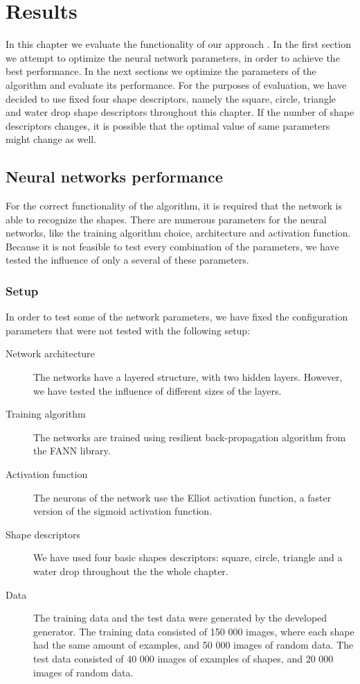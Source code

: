 \chapter{Results}
In this chapter we evaluate the functionality of our approach . In the first section\XX{,} we attempt to optimize  the neural network parameters, in order to achieve the best performance. In the next sections\XX{,} we optimize the parameters of the algorithm and evaluate its performance. For the purposes of evaluation, we have decided to use fixed four shape descriptors, namely the square, circle, triangle and water drop shape descriptors throughout this chapter. If the number of shape descriptors changes, it is possible that the optimal value of same parameters might change as well.  

\section{Neural networks performance}
For the correct functionality of the algorithm, it is required that the network is able to recognize the shapes. There are numerous parameters for the neural networks, like the training algorithm choice, architecture and activation function. Because it is not feasible to test every combination of the parameters, we have tested the influence of only a several of these parameters.

\subsection{Setup}
In order to test some of the network parameters, we have fixed the configuration parameters that were not tested with the following setup:
\begin{description}
\item [Network architecture] The networks have a layered structure, with two hidden layers. However, we have tested the influence of different sizes of the layers.
\item [Training algorithm] The networks are trained using resilient back-propagation algorithm from the FANN library.
\item [Activation function] The neurons of the network use the Elliot activation function, a faster version of the sigmoid activation function.
\item [Shape descriptors] We have used four basic shapes descriptors: square, circle, triangle and a water drop throughout the the whole chapter. 
\item [Data] The training data and the test data were generated by the developed generator. The training data consisted of 150 000 images, where each shape had the same amount of examples, and 50 000 images of random data. The test data consisted of 40 000 images of examples of shapes, and 20 000 images of random data.
\end{description}

